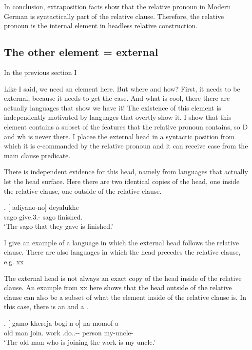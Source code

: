 In conclusion, extraposition facts show that the relative pronoun in Modern German is syntactically part of the relative clause. Therefore, the relative pronoun is the internal element in headless relative construction.


\subsection{The other element = external}\label{sec:external-element}

In the previous section I

Like I said, we need an element here. But where and how? First, it needs to be external, because it needs to get the case. And what is cool, there there are actually languages that show we have it!
The existence of this element is independently motivated by languages that overtly show it.
I show that this element contains a subset of the features that the relative pronoun contains, so D and wh is never there.
I placee the external head in a syntactic position from which it is c-commanded by the relative pronoun and it can receive case from the main clause predicate.


There is independent evidence for this head, namely from languages that actually let the head surface. Here there are two identical copies of the head, one inside the relative clause, one outside of the relative clause.

\exg. [ adiyano-no]  deyalukhe\\
 sago give.3.- sago finished.\\
 `The sago that they gave is finished.' 

I give an example of a language in which the external head follows the relative clause. There are also languages in which the head precedes the relative clause, e.g. xx

The external head is not always an exact copy of the head inside of the relative clause. An example from xx here shows that the head outside of the relative clause can also be a subset of what the element inside of the relative clause is. In this case, there is an  and a .

\exg. [ gamo khereja bogi-n-o]  na-momof-a\\
 {old man} join. work .do..-- person my-uncle-\\
 `The old man who is joining the work is my uncle.'

